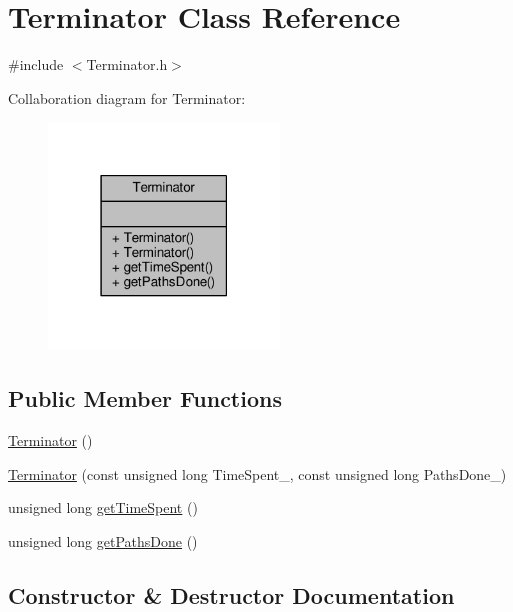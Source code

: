 \hypertarget{classTerminator}{}\section{Terminator Class Reference}
\label{classTerminator}


{\ttfamily \#include $<$Terminator.\+h$>$}



Collaboration diagram for Terminator\+:
\nopagebreak
\begin{figure}[H]
\begin{center}
\leavevmode
\includegraphics[width=174pt]{classTerminator__coll__graph}
\end{center}
\end{figure}
\subsection*{Public Member Functions}
\begin{DoxyCompactItemize}
\item 
\hyperlink{classTerminator_ab5d1799c7d034c50be940ab652c75cf1}{Terminator} ()
\item 
\hyperlink{classTerminator_a299544700fc005ae525e1c20e34ed540}{Terminator} (const unsigned long Time\+Spent\+\_\+, const unsigned long Paths\+Done\+\_\+)
\item 
unsigned long \hyperlink{classTerminator_a506dd03f7b0d83ca067681a1167f83ab}{get\+Time\+Spent} ()
\item 
unsigned long \hyperlink{classTerminator_af2a79ca6dac8a68305485bef15748ab5}{get\+Paths\+Done} ()
\end{DoxyCompactItemize}


\subsection{Constructor \& Destructor Documentation}
\hypertarget{classTerminator_ab5d1799c7d034c50be940ab652c75cf1}{}\label{classTerminator_ab5d1799c7d034c50be940ab652c75cf1} 
